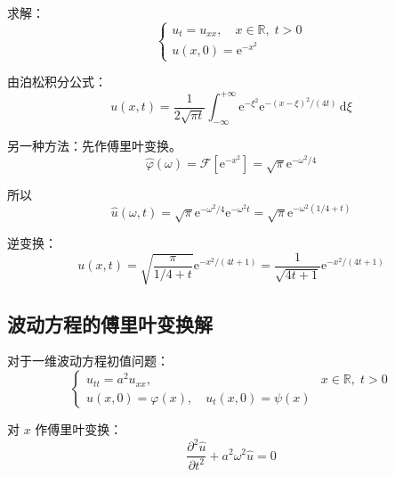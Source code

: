 \begin{lizi}{}{}
求解：
\begin{equation}
    \begin{cases}
        u_t = u_{xx}, \quad x \in \mathbb{R}, \; t > 0 \\
        u(x, 0) = \mathrm{e}^{-x^2}
    \end{cases}
\end{equation}

\begin{jie}
    由泊松积分公式：
    \begin{equation}
        u(x, t) = \frac{1}{2\sqrt{\pi t}}\int_{-\infty}^{+\infty} \mathrm{e}^{-\xi^2}\mathrm{e}^{-(x-\xi)^2/(4t)}\,\mathrm{d}\xi
    \end{equation}
    
    另一种方法：先作傅里叶变换。
    \begin{equation}
        \hat{\varphi}(\omega) = \mathcal{F}[\mathrm{e}^{-x^2}] = \sqrt{\pi}\mathrm{e}^{-\omega^2/4}
    \end{equation}
    
    所以
    \begin{equation}
        \hat{u}(\omega, t) = \sqrt{\pi}\mathrm{e}^{-\omega^2/4}\mathrm{e}^{-\omega^2 t} = \sqrt{\pi}\mathrm{e}^{-\omega^2(1/4+t)}
    \end{equation}
    
    逆变换：
    \begin{equation}
        u(x, t) = \sqrt{\frac{\pi}{1/4+t}}\mathrm{e}^{-x^2/(4t+1)} = \frac{1}{\sqrt{4t+1}}\mathrm{e}^{-x^2/(4t+1)}
    \end{equation}
\end{jie}
\end{lizi}

\subsection{波动方程的傅里叶变换解}

对于一维波动方程初值问题：
\begin{equation}
    \begin{cases}
        u_{tt} = a^2u_{xx}, & x \in \mathbb{R}, \; t > 0 \\
        u(x, 0) = \varphi(x), \quad u_t(x, 0) = \psi(x)
    \end{cases}
\end{equation}

对 $x$ 作傅里叶变换：
\begin{equation}
    \frac{\partial^2 \hat{u}}{\partial t^2} + a^2\omega^2\hat{u} = 0
\end{equation}

